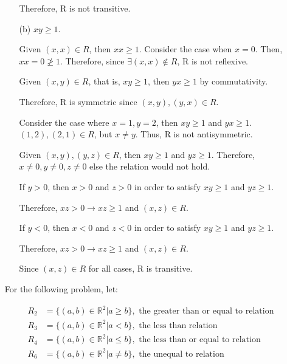 \documentclass[12pt]{article}
\newenvironment{answer}{\larger[2]}{}
\begin{document}
\begin{enumerate}
\begin{enumerate}
\begin{answer}
    Therefore, R is not transitive.
\end{answer}

\item[(b)] $xy \geq 1$.

\begin{answer}
    Given $(x, x) \in R$, then $xx \geq 1$. Consider the case when $x = 0$. Then, $xx = 0 \not \geq 1$. Therefore, since $\exists (x, x) \notin R$, R is not reflexive.

    Given $(x, y) \in R$, that is, $xy \geq 1$, then $yx \geq 1$ by commutativity. 
    
    Therefore, R is symmetric since $(x, y), (y, x) \in R$.

    Consider the case where $x = 1, y = 2$, then $xy \geq 1$ and $yx \geq 1$. $(1, 2), (2, 1) \in R$, but $x \neq y$. Thus, R is not antisymmetric.

    Given $(x, y), (y, z) \in R$, then $xy \geq 1$ and $yz \geq 1$. Therefore, $x \neq 0, y \neq 0, z \neq 0$ else the relation would not hold. 

    If $y > 0$, then $x > 0$ and $z > 0$ in order to satisfy $xy \geq 1$ and $yz \geq 1$.

    Therefore, $xz > 0 \to xz \geq 1$ and $(x, z) \in R$.

    If $y < 0$, then $x < 0$ and $z < 0$ in order to satisfy $xy \geq 1$ and $yz \geq 1$.

    Therefore, $xz > 0 \to xz \geq 1$ and $(x, z) \in R$.

    Since $(x, z) \in R$ for all cases, R is transitive.
\end{answer}

\end{enumerate}
%

\newpage



For the following problem, let:

\begin{align*}
    R_2 &= \{ (a,b) \in \mathbb{R}^2 | a \geq b \}, \text{ the greater than or equal to relation} \\
    R_3 &= \{ (a, b) \in \mathbb{R}^2 | a < b \}, \text{ the less than relation} \\
    R_4 &= \{ (a, b) \in \mathbb{R}^2 | a \leq b \}, \text{ the less than or equal to relation} \\
    R_6 &= \{ (a, b) \in \mathbb{R}^2 | a \neq b \}, \text{ the unequal to relation} \\
\end{align*}


\end{enumerate}
\end{document}
